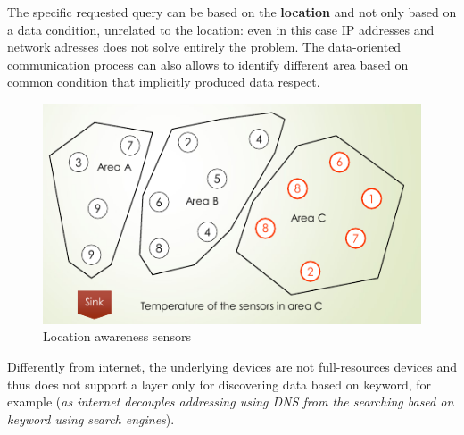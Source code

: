 \documentclass[10pt,a4paper]{report}
\theoremstyle{definition}
\begin{document}
The specific requested query can be based on the \textbf{location} and not only based on a data condition, unrelated to the location:  even in this case IP addresses and network adresses does not solve entirely the problem. The data-oriented communication process can also allows to identify different area based on common condition that implicitly produced data respect.
\begin{figure}[h]
	\centering\includegraphics[scale=0.50]{images/Pasted image 20230522190108.png}
	\caption{Location awareness sensors}
\end{figure}



Differently from internet, the underlying devices are not full-resources devices and thus does not support a layer only for discovering data based on keyword, for example (\textit{as internet decouples addressing using DNS from the searching based on keyword using search engines}).
\end{document}
